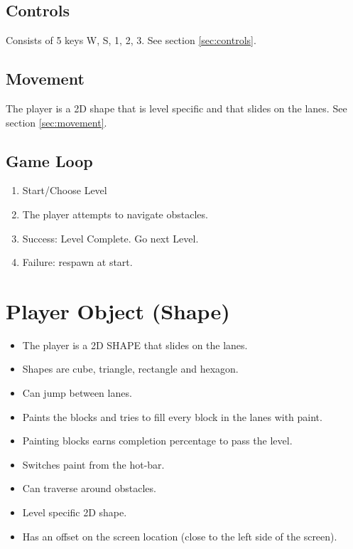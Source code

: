 \documentclass[11pt,a4paper]{report}
\begin{document}
\subsection{Controls}
Consists of 5 keys W, S, 1, 2, 3. See section \ref{sec:controls}.

\subsection{Movement}
The player is a 2D shape that is level specific and that slides on the lanes. See section \ref{sec:movement}.

\subsection{Game Loop}
\begin{enumerate}
  \item Start/Choose Level
  \item The player attempts to navigate obstacles.
  \item Success: Level Complete. Go next Level.
  \item Failure: respawn at start.
\end{enumerate}

\section{Player Object (Shape)}
\label{sec:player}
\begin{itemize}
  \item The player is a 2D SHAPE that slides on the lanes.
  \item Shapes are cube, triangle, rectangle and hexagon.
  \item Can jump between lanes.
  \item Paints the blocks and tries to fill every block in the lanes with paint.
  \item Painting blocks earns completion percentage to pass the level.
  \item Switches paint from the hot-bar.
  \item Can traverse around obstacles.
  \item Level specific 2D shape.
  \item Has an offset on the screen location (close to the left side of the screen).
\end{itemize}
\end{document}
